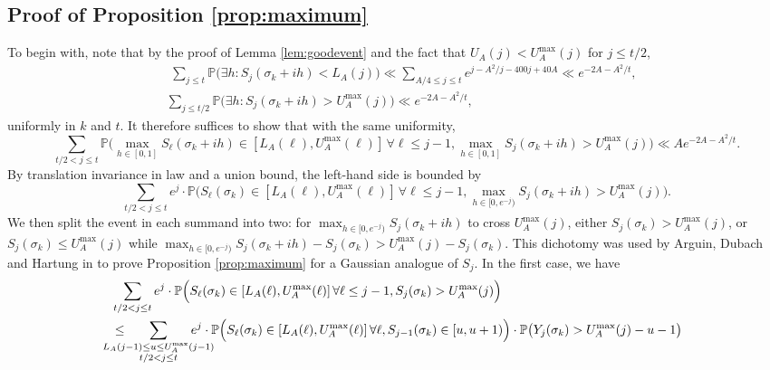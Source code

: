 \documentclass{amsart}
\theoremstyle{definition}
\theoremstyle{remark}
\numberwithin{equation}{section}
\begin{document}
\subsection{Proof of Proposition \ref{prop:maximum}}\label{sec:maximum} To begin with, note that by the proof of Lemma \ref{lem:goodevent} and the fact that $U_A(j)<U_A^{\max}(j)$ for $j\leq t/2$,
\begin{align*}
    &\,\,\sum_{j\leq t}\mathbb{P}\Big(\exists h:S_j(\sigma_k+ih)<L_A(j)\Big) \ll \sum_{A/4\leq j\leq t} e^{j-A^2/j-400j+40A} \ll e^{-2A-A^2/t},\\
    &\sum_{j\leq t/2}\mathbb{P}\Big(\exists h:S_j(\sigma_k+ih)>U_A^{\text{max}}(j)\Big) \ll e^{-2A-A^2/t},
\end{align*}
uniformly in $k$ and $t$.
It therefore suffices to show that with the same uniformity,
\begin{equation}\label{eq:3.1main}
        \sum_{t/2< j\leq  t}\mathbb{P}\Big(\max_{h\in[0,1]}S_\ell(\sigma_k+ih)\in [L_A(\ell), U_A^{\text{max}}(\ell)] \,\forall \ell\leq j-1, \max_{h\in [0,1]}S_{j}(\sigma_k+ih)>U_A^{\max}(j) \Big) \ll Ae^{-2A-A^2/t}.
\end{equation}
By translation invariance in law and a union bound, the left-hand side is bounded by
\[
    \sum_{t/2< j\leq  t}e^{j}\cdot \mathbb{P}\Big(S_\ell(\sigma_k)\in [L_A(\ell), U_A^{\text{max}}(\ell)] \,\forall \ell\leq j-1, \max_{h\in [0,e^{-j})}S_{j}(\sigma_k+ih)>U_A^{\max}(j) \Big).
\]
We then split the event in each summand into two: for $\max_{h\in [0,e^{-j})}S_j(\sigma_k+ih)$ to cross $U_A^{\text{max}}(j)$, either $S_j(\sigma_k)>U_A^{\text{max}}(j)$, or $S_j(\sigma_k)\leq U_A^{\text{max}}(j)$ while $\max_{h\in [0,e^{-j})}S_j(\sigma_k+ih)-S_j(\sigma_k
)>U_A^{\text{max}}(j)-S_j(\sigma_k)$.
This dichotomy was used by Arguin, Dubach and Hartung in \cite{ADH} to prove Proposition \ref{prop:maximum} for a Gaussian analogue of $S_j$.  In the first case, we have 
\begin{align}
    &\sum_{t/2<j\leq t} e^{j}\cdot\mathbb{P}\Big(S_\ell(\sigma_k)\in [L_A(\ell), U_A^{\text{max}}(\ell)] \,\forall \ell\leq j-1, S_{j}(\sigma_k)>U_A^{\max}(j) \Big)\label{eq:option1}\\
    &\leq \hspace{-20px}\sum_{\substack{L_A(j-1)\leq u\leq U^{\text{max}}_A(j-1)\\t/2<j\leq t}} \hspace{-20px}e^{j}\cdot\mathbb{P}\Big(S_\ell(\sigma_k)\in [L_A(\ell), U_A^{\text{max}}(\ell)] \,\forall \ell, S_{j-1}(\sigma_k)\in[u,u+1) \Big)\cdot\mathbb{P}\big(Y_j(\sigma_k)>U_A^{\max}(j)-u-1\big)\nonumber
\end{align}
\end{document}
